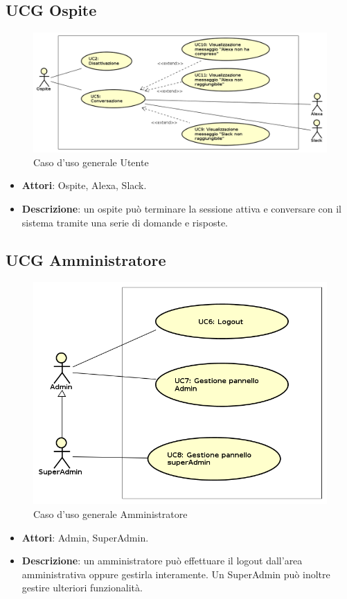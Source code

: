 \documentclass[../AnalisiDeiRequisiti.tex]{subfiles}
\begin{document}
\subsection{UCG Ospite} 
\label{sssec:UCG_Ospite}
\begin{figure}[!h]
	\centering
	\includegraphics[width=\textwidth]{UseCases/UCG_Ospite/UCG_Ospite.png}
	\caption{Caso d'uso generale Utente}
\end{figure}
\begin{itemize} 
\item \textbf{Attori}: Ospite, Alexa, Slack.
\item \textbf{Descrizione}: un ospite può terminare la sessione attiva e conversare con il sistema tramite una serie di domande e risposte.
\end{itemize}
\newpage
\subsection{UCG Amministratore} 
\label{sssec:UCG_Admin} 
\begin{figure}[!h]
	\centering
	\includegraphics[width=\textwidth]{UseCases/UCG_Amministratore/UCG_Amministratore.png}
	\caption{Caso d'uso generale Amministratore}
\end{figure}
\begin{itemize} 
\item \textbf{Attori}: Admin, SuperAdmin.
\item \textbf{Descrizione}: un amministratore può effettuare il logout dall'area amministrativa oppure gestirla interamente. Un SuperAdmin può inoltre gestire ulteriori funzionalità.
\end{itemize}
\newpage
\end{document}

